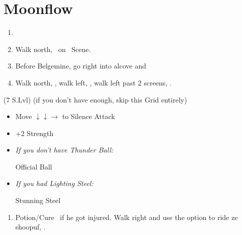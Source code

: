 \chapter{Moonflow}

\begin{enumerate}
    \item \formation{\tidus}{\kimahri}{\auron}
    \item Walk north, \sd\ on \kimahri\ Scene.
    \item Before Belgemine, go right into alcove and 
    \item Walk north, \sd, walk left, \sd, walk left past 2 screens, \sd.
\end{enumerate}
\begin{spheregrid}
    \begin{itemize}
        \wakkaf (7 S.Lvl) (if you don't have enough, skip this Grid entirely)
        \begin{itemize}
            \item Move $\downarrow\downarrow\rightarrow$ to Silence Attack
            \item +2 Strength
        \end{itemize}
    \end{itemize}
\end{spheregrid}
\begin{equip}
    \begin{itemize}
        \item \textit{If you don't have Thunder Ball:}
        \begin{itemize}
            \wakkaf Official Ball
        \end{itemize}
        \item \textit{If you had Lighting Steel:}
        \begin{itemize}
            \tidusf Stunning Steel
        \end{itemize}
    \end{itemize}
\end{equip}
\begin{enumerate}[resume]
    \item Potion/Cure \tidus\ if he got injured. Walk right and use the  option to ride ze shoopuf, \sd.
\end{enumerate}
\winvfill\lossvfill
